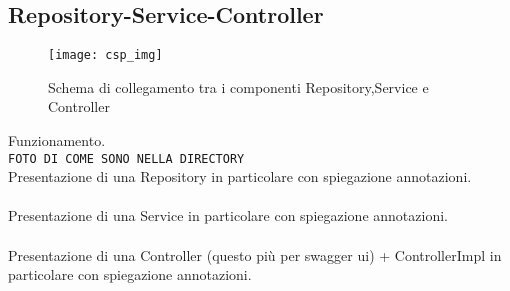 \subsection{Repository-Service-Controller}

\begin{figure}[H] 
    \centering 
    \texttt{[image: csp\_img]} 
    \caption{Schema di collegamento tra i componenti Repository,Service e Controller}
\end{figure}

\noindent Funzionamento.\\

\noindent \texttt{FOTO DI COME SONO NELLA DIRECTORY}\\

\noindent Presentazione di una Repository in particolare con spiegazione annotazioni.\\\\
Presentazione di una Service in particolare con spiegazione annotazioni.\\\\
Presentazione di una Controller (questo più per swagger ui) + ControllerImpl in particolare con spiegazione annotazioni.\\
